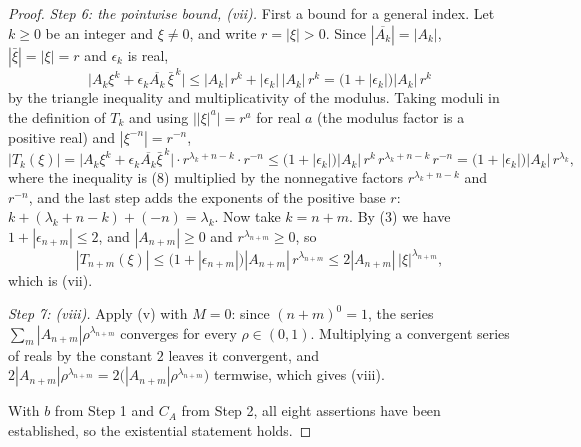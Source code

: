 \begin{proof}
\emph{Step 6: the pointwise bound, (vii).}  First a bound for a general index.
Let $k\ge0$ be an integer and $\xi\ne0$, and write $r=|\xi|>0$.  Since
$|\overline{A_k}|=|A_k|$, $|\bar\xi|=|\xi|=r$ and $\epsilon_k$ is real,
\begin{equation}\tag{8}
  \bigl|A_k\xi^{k}+\epsilon_k\overline{A_k}\,\bar\xi^{\,k}\bigr|
  \le|A_k|\,r^{k}+|\epsilon_k|\,|A_k|\,r^{k}
  =\bigl(1+|\epsilon_k|\bigr)|A_k|\,r^{k}
\end{equation}
by the triangle inequality and multiplicativity of the modulus.  Taking moduli
in the definition of $T_k$ and using $\bigl||\xi|^{a}\bigr|=r^{a}$ for real $a$
(the modulus factor is a positive real) and $|\xi^{-n}|=r^{-n}$,
\[
  |T_k(\xi)|
  =\bigl|A_k\xi^{k}+\epsilon_k\overline{A_k}\bar\xi^{\,k}\bigr|
     \cdot r^{\lambda_k+n-k}\cdot r^{-n}
  \le\bigl(1+|\epsilon_k|\bigr)|A_k|\,
     r^{k}\,r^{\lambda_k+n-k}\,r^{-n}
  =\bigl(1+|\epsilon_k|\bigr)|A_k|\,r^{\lambda_k},
\]
where the inequality is (8) multiplied by the nonnegative factors
$r^{\lambda_k+n-k}$ and $r^{-n}$, and the last step adds the exponents of the
positive base $r$:
$k+(\lambda_k+n-k)+(-n)=\lambda_k$.  Now take $k=n+m$.  By (3) we have
$1+|\epsilon_{n+m}|\le2$, and $|A_{n+m}|\ge0$ and $r^{\lambda_{n+m}}\ge0$, so
\[
  |T_{n+m}(\xi)|\le\bigl(1+|\epsilon_{n+m}|\bigr)|A_{n+m}|\,r^{\lambda_{n+m}}
  \le2|A_{n+m}|\,|\xi|^{\lambda_{n+m}} ,
\]
which is (vii).

\emph{Step 7: (viii).}  Apply (v) with $M=0$: since $(n+m)^{0}=1$, the series
$\sum_m|A_{n+m}|\rho^{\lambda_{n+m}}$ converges for every $\rho\in(0,1)$.
Multiplying a convergent series of reals by the constant $2$ leaves it
convergent, and $2|A_{n+m}|\rho^{\lambda_{n+m}}
=2\bigl(|A_{n+m}|\rho^{\lambda_{n+m}}\bigr)$ termwise, which gives (viii).

With $b$ from Step 1 and $C_A$ from Step 2, all eight assertions have been
established, so the existential statement holds.
\end{proof}
